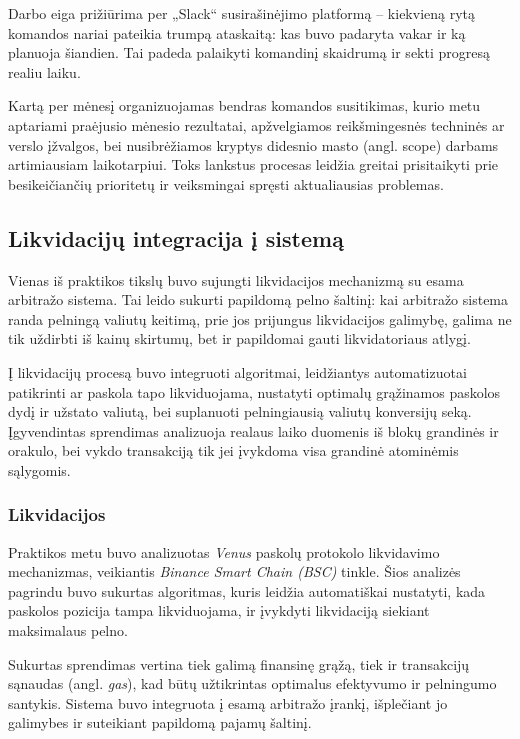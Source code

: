 \documentclass[]{VUMIFTemplateClass}
\begin{document}
Darbo eiga prižiūrima per „Slack“ susirašinėjimo platformą – kiekvieną rytą komandos nariai pateikia trumpą ataskaitą: kas buvo padaryta vakar ir ką planuoja šiandien. Tai padeda palaikyti komandinį skaidrumą ir sekti progresą realiu laiku.

Kartą per mėnesį organizuojamas bendras komandos susitikimas, kurio metu aptariami praėjusio mėnesio rezultatai, apžvelgiamos reikšmingesnės techninės ar verslo įžvalgos, bei nusibrėžiamos kryptys didesnio masto (angl. scope) darbams artimiausiam laikotarpiui. Toks lankstus procesas leidžia greitai prisitaikyti prie besikeičiančių prioritetų ir veiksmingai spręsti aktualiausias problemas.

\subsection{Likvidacijų integracija į sistemą}

Vienas iš praktikos tikslų buvo sujungti likvidacijos mechanizmą su esama arbitražo sistema. Tai leido sukurti papildomą pelno šaltinį: kai arbitražo sistema randa pelningą valiutų keitimą, prie jos prijungus likvidacijos galimybę, galima ne tik uždirbti iš kainų skirtumų, bet ir papildomai gauti likvidatoriaus atlygį.

Į likvidacijų procesą buvo integruoti algoritmai, leidžiantys automatizuotai patikrinti ar paskola tapo likviduojama, nustatyti optimalų grąžinamos paskolos dydį ir užstato valiutą, bei suplanuoti pelningiausią valiutų konversijų seką. Įgyvendintas sprendimas analizuoja realaus laiko duomenis iš blokų grandinės ir orakulo, bei vykdo transakciją tik jei įvykdoma visa grandinė atominėmis sąlygomis.

\subsubsection{Likvidacijos}

Praktikos metu buvo analizuotas \textit{Venus} paskolų protokolo likvidavimo mechanizmas, veikiantis \textit{Binance Smart Chain (BSC)} tinkle. Šios analizės pagrindu buvo sukurtas algoritmas, kuris leidžia automatiškai nustatyti, kada paskolos pozicija tampa likviduojama, ir įvykdyti likvidaciją siekiant maksimalaus pelno.

Sukurtas sprendimas vertina tiek galimą finansinę grąžą, tiek ir transakcijų sąnaudas (angl. \textit{gas}), kad būtų užtikrintas optimalus efektyvumo ir pelningumo santykis. Sistema buvo integruota į esamą arbitražo įrankį, išplečiant jo galimybes ir suteikiant papildomą pajamų šaltinį.
\end{document}
